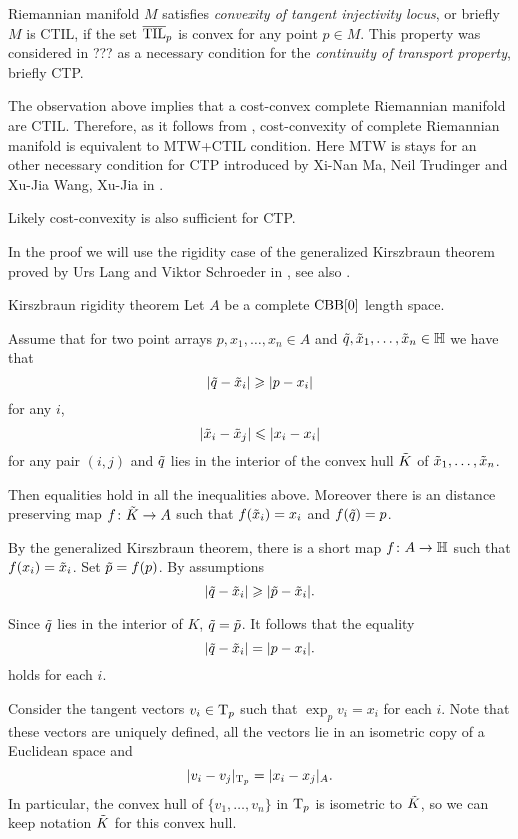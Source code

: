 Riemannian manifold $M$ satisfies \emph{convexity of tangent injectivity locus},
or briefly $M$ is CTIL,
if the set $\overline{\TIL}_p$ is convex for any point $p\in M$.
This property was considered in ??? as a necessary condition for the \emph{continuity of transport property}, briefly CTP.

The observation above implies that a cost-convex complete Riemannian manifold are CTIL.
Therefore, as it follows from \cite{loeper}, cost-convexity of complete Riemannian manifold is equivalent to MTW+CTIL condition.
Here MTW is stays for an other necessary condition for CTP introduced by Xi-Nan Ma, Neil Trudinger and Xu-Jia Wang, Xu-Jia in \cite{MTW}.

Likely cost-convexity is also sufficient for CTP.

In the proof we will use the rigidity case of the generalized Kirszbraun theorem proved by Urs Lang and Viktor Schroeder in \cite{LS}, see also \cite{AKP}.

\begin{thm}{Kirszbraun rigidity theorem}\label{thm:kirszbraun-rigid}
Let $A$ be a complete $\CBB[0]$ length space.

Assume that for two point arrays $p,x_1,\dots,x_n\in A$ and $\~q, \~x_1,\dots,\~x_n\in \HH$ we have that 
\[|\~q-\~x_i|\ge |p-x_i|\]
for any $i$,
\[|\~x_i-\~x_j|\le |x_i-x_i|\]
for any pair $(i,j)$
and $\~q$ lies in the interior of the convex hull $\~K$ of $\~x_1,\dots,\~x_n$.

Then equalities hold in all the inequalities above.
Moreover there is an distance preserving map $f\:\~K\to A$ such that $f(\~x_i)=x_i$ and $f(\~q)=p$. 
\end{thm}

By the generalized Kirszbraun theorem, there is a short map $f\:A\to \HH$
such that $f(x_i)=\~x_i$.
Set  $\~p=f(p)$.
By assumptions
\[|\~q-\~x_i|\ge |\~p-\~x_i|.\]

Since $\~q$ lies in the interior of $K$, $\~q=\~p$.
It follows that the equality 
\[|\~q-\~x_i|= |p-x_i|.\]
holds for each $i$.

Consider the tangent vectors $v_i\in\T_p$ such that $\exp_pv_i=x_i$ for each $i$.
Note that these vectors are uniquely defined,
all  the vectors lie in an isometric copy of a Euclidean space
and 
\[|v_i-v_j|_{\T_p}=|x_i-x_j|_A.\]
In particular, the convex hull of $\{v_1,\dots,v_n\}$ in $\T_p$ is isometric to $\~K$,
so we can keep notation  $\~K$ for this convex hull.

